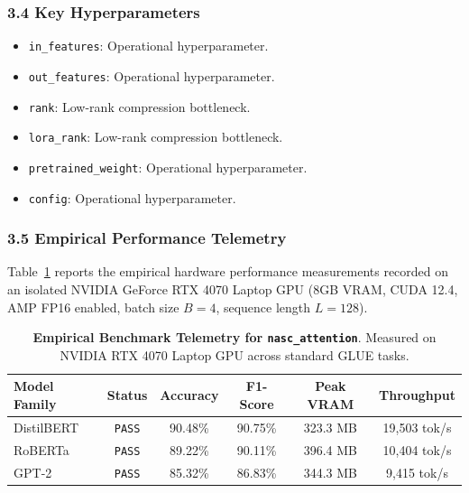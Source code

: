 \subsubsection*{3.4 Key Hyperparameters}
\begin{itemize}
    \item \texttt{in\_features}: Operational hyperparameter.
    \item \texttt{out\_features}: Operational hyperparameter.
    \item \texttt{rank}: Low-rank compression bottleneck.
    \item \texttt{lora\_rank}: Low-rank compression bottleneck.
    \item \texttt{pretrained\_weight}: Operational hyperparameter.
    \item \texttt{config}: Operational hyperparameter.
\end{itemize}

\subsubsection*{3.5 Empirical Performance Telemetry}
Table~\ref{tab:telemetry_nasc_attention} reports the empirical hardware performance measurements recorded on an isolated NVIDIA GeForce RTX 4070 Laptop GPU (8GB VRAM, CUDA 12.4, AMP FP16 enabled, batch size $B=4$, sequence length $L=128$).

\begin{table}[h]
\centering
\small
\caption{\textbf{Empirical Benchmark Telemetry for \texttt{nasc\_attention}}. Measured on NVIDIA RTX 4070 Laptop GPU across standard GLUE tasks.}
\label{tab:telemetry_nasc_attention}
\begin{tabular*}{\columnwidth}{@{\extracolsep{\fill}}lccccc}
\toprule
\textbf{Model Family} & \textbf{Status} & \textbf{Accuracy} & \textbf{F1-Score} & \textbf{Peak VRAM} & \textbf{Throughput} \\
\midrule
DistilBERT & \texttt{PASS} & 90.48\% & 90.75\% & 323.3 MB & 19,503 tok/s \\
RoBERTa & \texttt{PASS} & 89.22\% & 90.11\% & 396.4 MB & 10,404 tok/s \\
GPT-2 & \texttt{PASS} & 85.32\% & 86.83\% & 344.3 MB & 9,415 tok/s \\
\bottomrule
\end{tabular*}
\end{table}

